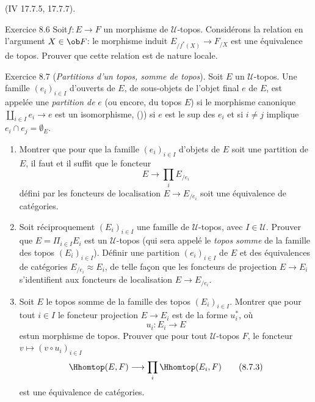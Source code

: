 \documentclass[10pt]{../fichiers-configuration-latex/smfart}
\begin{document}
\noindent (\EGA IV 17.7.5, 17.7.7).

\begin{enonce*}[remark]{Exercice 8.6}
Soit\pageoriginale $f:E\rightarrow F$ un morphisme de
$𝒰$-topos. Considérons la relation en l'argument $X\in \ob
F$: le morphisme induit $E_{/f^{\ast}(X)}\rightarrow F_{/X}$ est une
équivalence de topos. Prouver que cette relation est de nature
locale.
\end{enonce*}

\begin{enonce*}[remark]{Exercice 8.7}
(\emph{Partitions d'un topos, somme de topos}). Soit $E$ un
$𝒰$-topos. Une famille $(e_i)_{i\in I}$ d'ouverts de $E$,
\ie de sous-objets de l'objet final $e$ de $E$, est appelée une
\emph{partition de} $e$ (ou encore, du topos $E$) si le morphisme
canonique $\amalg_{i\in I}e_i\rightarrow e$ est un isomorphisme, \ie
()) si $e$ est le sup des $e_i$ et si $i\neq j$
implique $e_i\cap e_j=∅_E$.
\begin{enumerate}
\renewcommand{\theenumi}{\alph{enumi}}
\renewcommand{\labelenumi}{\theenumi)}
\item Montrer que pour que la famille $(e_i)_{i\in I}$ d'objets de $E$
soit une partition de $E$, il faut et il suffit que le foncteur
\begin{equation*}
E\longrightarrow \prod_i E_{/e_i}\tag{8.7.1}
\end{equation*}
défini par les foncteurs de localisation $E\rightarrow E_{/e_i}$ soit
une équivalence de catégories.

\item Soit réciproquement $(E_i)_{i\in I}$ une famille de
$𝒰$-topos, avec $I\in 𝒰$. Prouver que $E=\Pi_{i\in
I} E_i$ est un $𝒰$-topos (qui sera appelé le \emph{topos
somme} de la famille des topos $(E_i)_{i\in I}$). Définir une
partition $(e_i)_{i\in I}$ de $E$ et des équivalences de catégories
$E_{/e_i}\approx E_i$, de telle façon que les foncteurs de
projection $E\rightarrow E_i$ s'identifient aux foncteurs de
localisation $E\rightarrow E_{/e_i}$.

\item Soit $E$ le topos somme de la famille des topos $(E_i)_{i\in
I}$. Montrer que pour tout $i\in I$ le foncteur projection
$E\rightarrow E_i$ est de la forme $u^{\ast}_i$, où
\begin{equation*}
u_i:E_i\longrightarrow E\tag{8.7.2}
\end{equation*}
est\pageoriginale un morphisme de topos. Prouver que pour tout
$𝒰$-topos $F$, le foncteur $v\mapsto (v\circ u_i)_{i\in I}$
\begin{equation*}
\Hhomtop(E,F)\longrightarrow \prod_i\Hhomtop(E_i,F)\tag{8.7.3}
\end{equation*}
est une équivalence de catégories.


\end{enumerate}
\end{enonce*}
\end{document}

